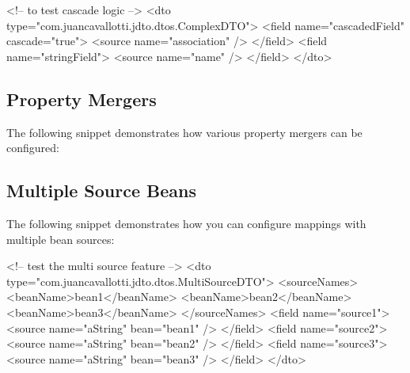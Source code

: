 \documentclass[11pt]{article}
\begin{document}
\begin{xml}
<!-- to test cascade logic -->
<dto type="com.juancavallotti.jdto.dtos.ComplexDTO">
    <field name="cascadedField" cascade="true">
        <source name="association" />
    </field>
    <field name="stringField">
        <source name="name" />
    </field>
</dto>
\end{xml}


\subsection{Property Mergers}

The following snippet demonstrates how various property mergers can be configured:


\subsection{Multiple Source Beans}

The following snippet demonstrates how you can configure mappings with multiple bean sources:

\begin{xml}
<!-- test the multi source feature -->
<dto type="com.juancavallotti.jdto.dtos.MultiSourceDTO">
    <sourceNames>
        <beanName>bean1</beanName>
        <beanName>bean2</beanName>
        <beanName>bean3</beanName>
    </sourceNames>
    <field name="source1">
        <source name="aString" bean="bean1" />
    </field>
    <field name="source2">
        <source name="aString" bean="bean2" />
    </field>
    <field name="source3">
        <source name="aString" bean="bean3" />
    </field>
</dto> 
\end{xml}
\end{document}
